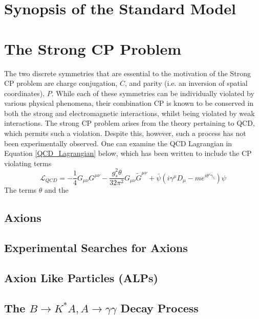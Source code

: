 \section{Synopsis of the Standard Model}
\section{The Strong CP Problem}The two discrete symmetries that are essential to the motivation of the Strong CP problem are charge conjugation, $C$, and parity (i.e. an inversion of spatial coordinates), $P$. While each
of these symmetries can be individually violated by various physical phenomena, their combination CP is known to be conserved in both the strong and electromagnetic interactions, whilst being violated by weak interactions. The strong CP problem arises from the theory pertaining to QCD, which
permits such a violation. Despite this, however, such a process has not been experimentally observed. One can examine the QCD Lagrangian in Equation \ref{QCD_Lagrangian} below, which has been written to include the CP violating terms
\begin{equation}\label{QCD_Lagrangian}
    \mathcal{L}_{QCD} = -\frac{1}{4}G_{\mu\nu}G^{\mu\nu}-\frac{g_{s}^{2}\theta}{32\pi^{2}}G_{\mu\nu}\tilde{G}^{\mu\nu}+\bar{\psi}(i\gamma^{\mu}D_{\mu}-me^{i\theta'\gamma_{5}})\psi
\end{equation}
The terms $\theta$ and the


\subsection{Axions}
\subsection{Experimental Searches for Axions}
\subsection{Axion Like Particles (ALPs)}
\subsection{The $B\rightarrow K^{*}A, A\rightarrow\gamma\gamma$ Decay Process}